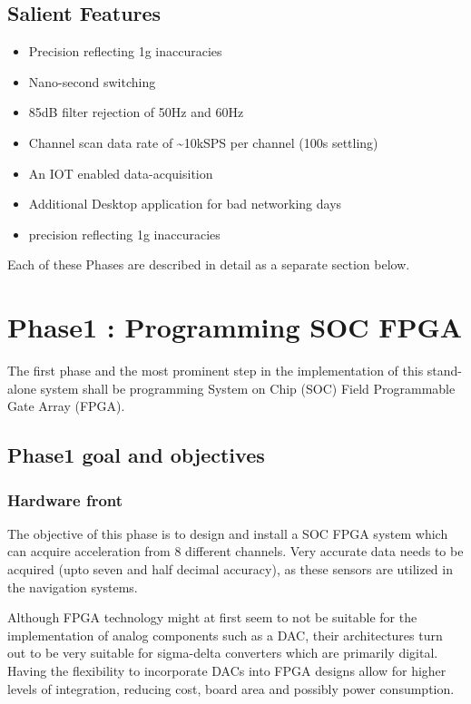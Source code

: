 \documentclass{FR16}
\begin{document}
\subsection{Salient Features}
\begin{itemize}
    \item Precision reflecting 1\textmu g inaccuracies
    \item Nano-second switching
    \item 85dB filter rejection of 50Hz and 60Hz
    \item Channel scan data rate of \sim 10kSPS per channel (100\textmu s settling)
    \item An IOT enabled data-acquisition
    \item Additional Desktop application for bad networking days
    \item precision reflecting 1\textmu g inaccuracies
    

\end{itemize}


Each of these Phases are described in detail as a separate section below.
\newpage
\section{Phase1 : Programming SOC FPGA}

The first phase and the most prominent step in the implementation of this stand-alone system shall be programming System on Chip (SOC) Field Programmable Gate Array (FPGA). 


\subsection{Phase1 goal and objectives}

\subsubsection{Hardware front}
The objective of this phase is to design and install a SOC FPGA system which can acquire acceleration from 8 different channels. Very accurate data needs to be acquired (upto seven and half decimal accuracy), as these sensors are  utilized in the navigation systems. 

Although FPGA technology might at first seem to not be suitable for the implementation of analog components such as a DAC, their architectures turn out to be very suitable for sigma-delta converters which are primarily digital. Having the flexibility to incorporate DACs into FPGA designs allow for higher levels of integration, reducing cost, board area and possibly power consumption.
\end{document}
